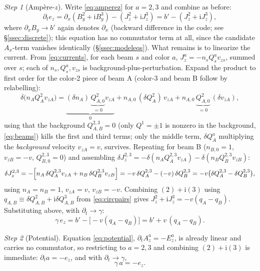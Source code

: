 \documentclass[11pt,a4paper]{article}
\numberwithin{equation}{section}
\theoremstyle{remark}
\newtheorem{step}{Step}[subsection]
\newcommand{\ii}{\mathrm{i}}
\begin{document}
\begin{step}[Amp\`ere-$z$]
Write \eqref{eq:amperez} for $a=2,3$ and combine as before:
\begin{equation}
\partial_te_z=\partial_x(B_y^2+\ii B_y^3)-(J_z^2+\ii J_z^3)
=b'-(J_z^2+\ii J_z^3),
\end{equation}
where $\partial_xB_y\to b'$ again denotes $\partial_x$ (backward
difference in the code; see \S\ref{ssec:discrete}); this equation has no
commutator term at all, since the candidate $A_x$-term vanishes
identically (\S\ref{ssec:modeleqs}). What remains is to linearize the
current. From \eqref{eq:currents}, for each beam $s$ and color $a$,
$J_z^a=-n_sQ_s^av_{zs}$, summed over $s$; each of $n_s,Q_s^a,v_{zs}$ is
background-plus-perturbation. Expand the product to first order for the
color-2 piece of beam A (color-3 and beam B follow by relabelling):
\begin{equation}
\delta\bigl(n_AQ_A^2v_{zA}\bigr)
=\underbrace{(\delta n_A)\,\underbrace{Q_{A,0}^2}_{=0}v_{zA}}_{0}
+n_{A,0}\,(\delta Q_A^2)\,v_{zA}
+n_{A,0}\,\underbrace{Q_{A,0}^2}_{=0}\,(\delta v_{zA}),
\end{equation}
using that the background $Q^{2,3}_{A,B}=0$ (only $Q^1=\pm1$ is nonzero in
the background, \eqref{eq:beams}) kills the first and third terms; only
the middle term, $\delta Q^a_A$ multiplying the \emph{background} velocity
$v_{zA}=v$, survives. Repeating for beam B ($n_{B,0}=1$, $v_{zB}=-v$,
$Q^{2,3}_{B,0}=0$) and assembling
$\delta J_z^{2,3}=-\delta(n_AQ_A^{2,3}v_{zA})-\delta(n_BQ_B^{2,3}v_{zB})$:
\begin{equation}
\delta J_z^{2,3}
=-\Bigl[n_A\,\delta Q^{2,3}_A v_{zA}+n_B\,\delta Q^{2,3}_B v_{zB}\Bigr]
=-v\,\delta Q_A^{2,3}-(-v)\,\delta Q_B^{2,3}
=-v\bigl(\delta Q_A^{2,3}-\delta Q_B^{2,3}\bigr),
\end{equation}
using $n_A=n_B=1$, $v_{zA}=v$, $v_{zB}=-v$. Combining $(2)+\ii(3)$ using
$q_{A,B}\equiv\delta Q^2_{A,B}+\ii\delta Q^3_{A,B}$ from
\eqref{eq:circpairs} gives $J_z^2+\ii J_z^3=-v(q_A-q_B)$. Substituting
above, with $\partial_t\to\gamma$:
\begin{equation}
\gamma\,e_z=b'-\bigl[-v(q_A-q_B)\bigr]=b'+v\,(q_A-q_B).
\label{eq:lin-ez}
\end{equation}
\end{step}

\begin{step}[Potential]
Equation \eqref{eq:potential}, $\partial_tA_z^a=-E_z^a$, is already linear
and carries no commutator, so restricting to $a=2,3$ and combining
$(2)+\ii(3)$ is immediate: $\partial_ta=-e_z$, and with $\partial_t\to
\gamma$,
\begin{equation}
\gamma\,a=-e_z .
\label{eq:lin-a}
\end{equation}
\end{step}
\end{document}
